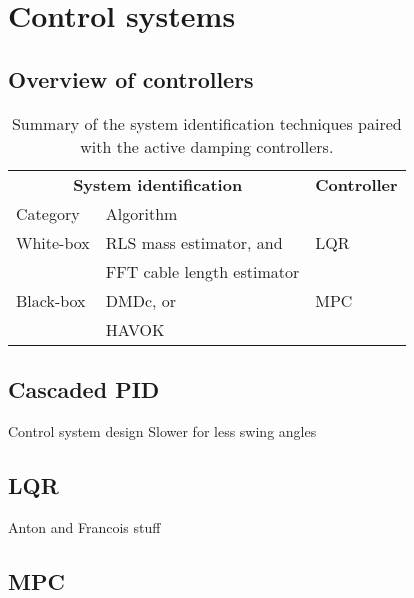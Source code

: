 \graphicspath{{control/fig/}}

\chapter{Control systems}
\label{chap:control}

    \FloatBarrier\section{Overview of controllers}

        \begin{table}[!h]
            \renewcommand{\arraystretch}{1.1}
            \centering
            \caption{Summary of the system identification techniques paired with the active damping controllers.}
            \begin{tabularx}{0.75\linewidth}{@{}lll@{}}
                \toprule
                \multicolumn{2}{c}{\textbf{System identification}}   & \textbf{Controller} \\
                \cmidrule(lr){1-2}
                Category    & Algorithm                     & \\
                \midrule
                White-box   & RLS mass estimator, and       & LQR \\
                            & FFT cable length estimator    & \\
                Black-box   & DMDc, or                      & MPC \\
                            & HAVOK                         & \\
                \bottomrule
            \end{tabularx}
            \label{tbl:controller_summary}
        \end{table}
    

    \FloatBarrier\section{Cascaded PID}

        Control system design
        Slower for less swing angles

    \FloatBarrier\section{LQR}

        Anton and Francois stuff

    \FloatBarrier\section{MPC}

